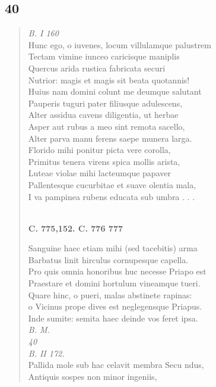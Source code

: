 \documentclass[11pt, a4paper]{report}
\begin{document}
            \subsection*{40}
      \begin{verse}
      \textit{B. I 160} \\ Hunc ego,  \lbrack o \rbrack  iuvenes, locum villulamque palustrem \\ Tectam vimine iunceo caricisque maniplis \\ Quercus arida rustica fabricata securi \\ Nutrior: magis et magis sit beata quotannis! \\ Huius nam domini colunt me deumque salutant \\ Pauperis tuguri pater filiusque adulescens, \\ Alter assidua cavens diligentia, ut herbae \\ Asper aut rubus a meo sint remota sacello, \\ Alter parva manu ferens saepe munera larga. \\ Florido mihi ponitur picta vere corolla, \\ Primitus tenera virens spica mollis arista, \\ Luteae violae mihi lacteumque papaver \\ Pallentesque cucurbitae et suave olentia mala, \\ I va pampinea rubens educata sub umbra . . . \\ 
        ﻿\pagebreak 
    \begin{center} \textbf{C. 775,152. C. 776 777} \end{center} \marginpar{[261]} Sanguine  \lbrack haec \rbrack  etiam mihi (sed tacebitis) arma \\ Barbatus linit hirculus cornupesque capella. \\ Pro quis omnia honoribus huc necesse Priapo est \\ Praestare et domini hortulum vineamque tueri. \\ Quare hinc, o pueri, malas abstinete rapinas: \\ o Vicinus prope dives est neglegensque Priapus. \\ Inde sumite: semita haec deinde vos feret ipsa. \\ \textit{B. M.} \\ \textit{40} \\ \textit{B. II 172.} \\ Pallida mole sub hac celavit membra Secu \lbrack ndus, \\ Antiquis sospes non minor ingeniis, \\ 
      \end{verse}
  
\end{document}
